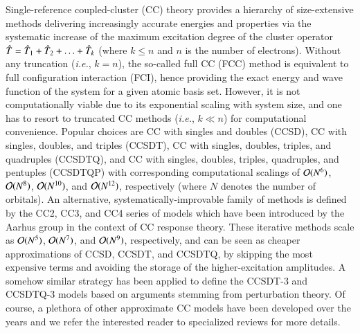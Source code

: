 \documentclass[aip,jcp,reprint,noshowkeys,superscriptaddress]{revtex4-1}
\newcommand{\ie}{\textit{i.e.}}
\newcommand{\hT}{\Hat{T}}
\begin{document}
Single-reference coupled-cluster (CC) theory provides a hierarchy of size-extensive methods delivering increasingly accurate energies and properties via the systematic increase of the maximum excitation degree of the cluster operator $\hT = \hT_1 + \hT_2 + \ldots + \hT_k$ (where $k \le n$ and $n$ is the number of electrons). \cite{Cizek_1966,Paldus_1972,Crawford_2000,Bartlett_2007,Shavitt_2009}
Without any truncation (\ie, $k = n$), the so-called full CC (FCC) method is equivalent to full configuration interaction (FCI), hence providing the exact energy and wave function of the system for a given atomic basis set.
However, it is not computationally viable due to its exponential scaling with system size, and one has to resort to truncated CC methods  (\ie, $k \ll n$) for computational convenience.
Popular choices are CC with singles and doubles (CCSD), \cite{Cizek_1966,Purvis_1982} CC with singles, doubles, and triples (CCSDT), \cite{Noga_1987a,Scuseria_1988} CC with singles, doubles, triples, and quadruples (CCSDTQ), \cite{Oliphant_1991,Kucharski_1992} and 
CC with singles, doubles, triples, quadruples, and pentuples (CCSDTQP) \cite{Hirata_2000,Kallay_2001} with corresponding computational scalings of $\order*{N^{6}}$, $\order*{N^{8}}$,  $\order*{N^{10}}$, and  $\order*{N^{12}}$, respectively (where $N$ denotes the number of orbitals).
An alternative, systematically-improvable family of methods is defined by the CC2, \cite{Christiansen_1995a} CC3, \cite{Christiansen_1995b,Koch_1997} and CC4 \cite{Kallay_2005} series of models which have been introduced by the Aarhus group in the context of CC response theory. \cite{Christiansen_1998}
These iterative methods scale as $\order*{N^{5}}$, $\order*{N^{7}}$, and $\order*{N^{9}}$, respectively, and can be seen as cheaper approximations of CCSD, CCSDT, and CCSDTQ, by skipping the most expensive terms and avoiding the storage of the higher-excitation amplitudes.
A somehow similar strategy has been applied to define the CCSDT-3 \cite{Urban_1985,Noga_1987b} and CCSDTQ-3 \cite{Kallay_2005} models based on arguments stemming from perturbation theory.
Of course, a plethora of other approximate CC models have been developed over the years and we refer the interested reader to specialized reviews for more details. \cite{Crawford_2000,Piecuch_2002,Bartlett_2007,Shavitt_2009}
\end{document}
